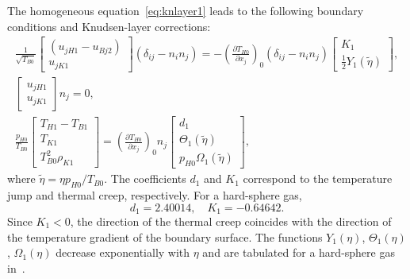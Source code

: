 \documentclass[10pt]{article}
\newcommand{\pder}[2][]{\frac{\partial#1}{\partial#2}}
\newcommand{\deltann}[2]{(\delta_{#1#2}-n_#1 n_#2)}
\newcommand{\onwall}[1]{\left(#1\right)_0}
\begin{document}
The homogeneous equation~\eqref{eq:knlayer1} leads to the following boundary conditions and Knudsen-layer corrections:
\begin{gather}
    \frac1{\sqrt{T_{B0}}}\begin{bmatrix} (u_{jH1} - u_{Bj2}) \\ u_{jK1} \end{bmatrix} \deltann{i}{j} =
        - \onwall{\pder[T_{H0}]{x_j}} \deltann{i}{j}
        \begin{bmatrix} K_1 \\ \frac12 Y_1(\tilde\eta) \end{bmatrix}, \label{eq:boundary_u1t}\\
    \begin{bmatrix} u_{jH1} \\ u_{jK1} \end{bmatrix} n_j = 0, \label{eq:boundary_u1n}\\
    \frac{p_{H0}}{T_{B0}}\begin{bmatrix} T_{H1} - T_{B1} \\ T_{K1} \\ T_{B0}^2\rho_{K1} \end{bmatrix} =
        \onwall{\pder[T_{H0}]{x_j}} n_j
        \begin{bmatrix} d_1 \\ \Theta_1(\tilde\eta) \\ p_{H0}\Omega_1(\tilde\eta) \end{bmatrix}, \label{eq:boundary_T1}
\end{gather}
where \(\tilde\eta = \eta p_{H0}/T_{B0}\).
The coefficients \(d_1\) and \(K_1\) correspond to the temperature jump and thermal creep, respectively.
For a hard-sphere gas,~\cite{Ohwada1989creep, Ohwada1989jump, Takata2015}
\begin{equation}\label{eq:slip_coeffs}
    d_1 = 2.40014, \quad K_1 = -0.64642.
\end{equation}
Since \(K_1<0\), the direction of the thermal creep coincides with the direction of the temperature gradient of the boundary surface.
The functions \(Y_1(\eta)\), \(\Theta_1(\eta)\), \(\Omega_1(\eta)\) decrease exponentially with \(\eta\)
and are tabulated for a hard-sphere gas in~\cite{Ohwada1989creep, Ohwada1989jump, Sone2002, Sone2007, Takata2015}.
\end{document}

